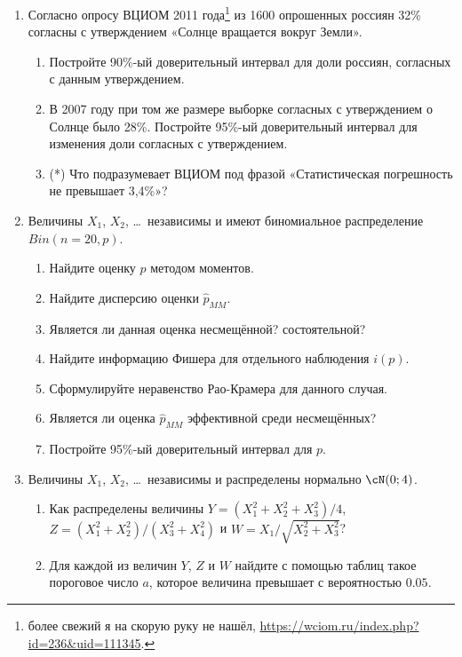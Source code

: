 \begin{enumerate}
\item  Согласно опросу ВЦИОМ 2011 года\footnote{более свежий я на скорую руку не нашёл, \url{https://wciom.ru/index.php?id=236&uid=111345}.} из 1600 опрошенных россиян 32\% согласны с утверждением «Солнце вращается вокруг Земли».

\begin{enumerate}
\item Постройте 90\%-ый доверительный интервал для доли россиян, согласных с данным утверждением.
\item В 2007 году при том же размере выборке согласных с утверждением о Солнце было 28\%. Постройте 95\%-ый доверительный интервал для изменения доли согласных с утверждением.
\item (*) Что подразумевает ВЦИОМ под фразой «Статистическая погрешность не превышает 3,4\%»?
\end{enumerate}

\item Величины $X_1$, $X_2$, \ldots~независимы и имеют биномиальное распределение $Bin(n=20, p)$.
\begin{enumerate}
\item Найдите оценку $p$ методом моментов.
\item Найдите дисперсию оценки $\hat p_{MM}$.
\item Является ли данная оценка несмещённой? состоятельной?
\item Найдите информацию Фишера для отдельного наблюдения $i(p)$.
\item Сформулируйте неравенство Рао-Крамера для данного случая.
\item Является ли оценка $\hat p_{MM}$ эффективной среди несмещённых?
\item Постройте 95\%-ый доверительный интервал для $p$.
\end{enumerate}

\item Величины $X_1$, $X_2$, \ldots~независимы и распределены нормально $\cN(0; 4)$.
\begin{enumerate}
  \item Как распределены величины $Y = (X_1^2 + X_2^2 + X_3^2)/4$, $Z = (X_1^2 + X_2^2)/(X_3^2 + X_4^2)$ и $W = X_1 / \sqrt{X_2^2 + X_3^2}$?
  \item Для каждой из величин $Y$, $Z$ и $W$ найдите с помощью таблиц такое пороговое число $a$, которое величина превышает с вероятностью $0.05$.
\end{enumerate}


\end{enumerate}
